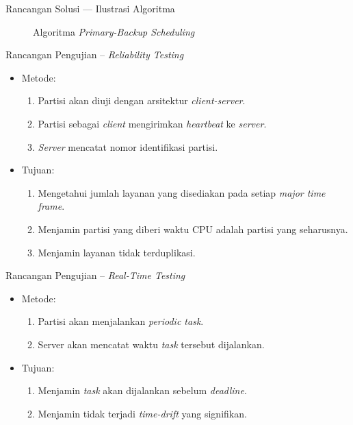 \documentclass[xetex]{beamer}
\begin{document}
\begin{frame}{Rancangan Solusi --- Ilustrasi Algoritma}
\begin{figure}

		\caption{Algoritma \textit{Primary-Backup Scheduling}}
	\end{figure}
\end{frame}
\begin{frame}{Rancangan Pengujian -- \textit{Reliability Testing}}
	\begin{itemize}
		\item Metode:
			\begin{enumerate}
				\item Partisi akan diuji dengan arsitektur \textit{client-server}.
				\item Partisi sebagai \textit{client} mengirimkan \textit{heartbeat} ke \textit{server}.
				\item \textit{Server} mencatat nomor identifikasi partisi.
			\end{enumerate}
		\item Tujuan:
			\begin{enumerate}
				\item Mengetahui jumlah layanan yang disediakan pada setiap \textit{major time frame}.
				\item Menjamin partisi yang diberi waktu CPU adalah partisi yang seharusnya.
				\item Menjamin layanan tidak terduplikasi.
			\end{enumerate}
	\end{itemize}
\end{frame}
\begin{frame}{Rancangan Pengujian -- \textit{Real-Time Testing}}
	\begin{itemize}
		\item Metode:
			\begin{enumerate}
				\item Partisi akan menjalankan \textit{periodic task}.
				\item Server akan mencatat waktu \textit{task} tersebut dijalankan.
			\end{enumerate}
		\item Tujuan:
			\begin{enumerate}
				\item Menjamin \textit{task} akan dijalankan sebelum \textit{deadline}.
				\item Menjamin tidak terjadi \textit{time-drift} yang signifikan.
			\end{enumerate}
	\end{itemize}
\end{frame}
\end{document}
